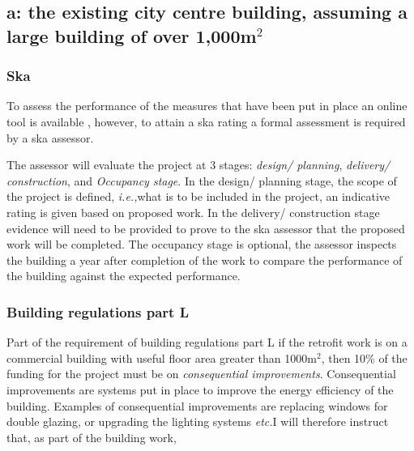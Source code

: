 \documentclass[a4paper,fleqn]{article}
\makeatletter
\newcommand{\ie}{\emph{i.e.,\@\xspace}}
\newcommand{\etc}{\emph{etc.\@\xspace}}
\renewcommand{\cite}{\citep}
\makeatother
\begin{document}


\subsection*{a: the existing city centre building, assuming a large building of over 1,000m$^2$}
\subsubsection*{Ska}

To assess the performance of the measures that have been put in place an online tool is available \cite{ska2013}, 
however, to attain a ska rating a formal assessment is required by a ska assessor. 

The assessor will evaluate the project at 3 stages: \emph{design/ planning}, \emph{delivery/ construction}, and 
\emph{Occupancy stage}. In the design/ planning stage, the scope of the project is defined, \ie what is to be 
included in the project, an indicative rating is given based on proposed work. In the delivery/ construction 
stage evidence will need to be provided to prove to the ska assessor that the proposed work will be completed.
The occupancy stage is optional, the assessor inspects the building a year after completion of the work to 
compare the performance of the building against the expected performance.



\subsubsection*{Building regulations part L}
Part of the requirement of building regulations part L if the retrofit work is on a commercial building with 
useful floor area greater than 1000m$^2$, then 10\% of the funding for the project must be on 
\emph{consequential improvements}. Consequential improvements are systems put in place to improve the energy 
efficiency of the building. Examples of consequential improvements are replacing windows for double glazing, or 
upgrading the lighting systems \etc I will therefore instruct that, as part of the building work, 
\end{document}
